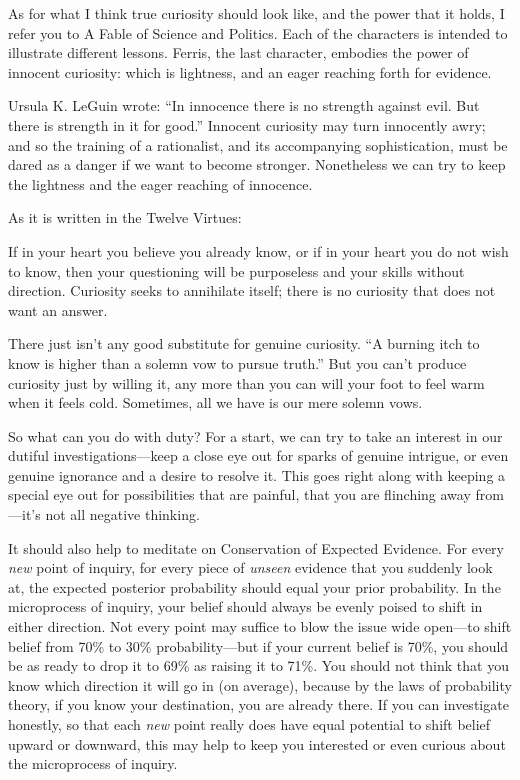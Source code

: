 {
 As for what I think true curiosity should look like, and the power
that it holds, I refer you to A Fable of Science and Politics. Each of
the characters is intended to illustrate different lessons. Ferris, the
last character, embodies the power of innocent curiosity: which is
lightness, and an eager reaching forth for evidence.}

{
 Ursula K. LeGuin wrote: ``In innocence there is
no strength against evil. But there is strength in it for
good.'' Innocent curiosity may
turn innocently awry; and so the training of a rationalist, and its
accompanying sophistication, must be dared as a danger if we want to
become stronger. Nonetheless we can try to keep the lightness and the
eager reaching of innocence.}

{
 As it is written in the Twelve Virtues:}

{
 If in your heart you believe you already know, or if in your heart
you do not wish to know, then your questioning will be purposeless and
your skills without direction. Curiosity seeks to annihilate itself;
there is no curiosity that does not want an answer.}

{
 There just isn't any good substitute for genuine
curiosity. ``A burning itch to know is higher than a
solemn vow to pursue truth.'' But you
can't produce curiosity just by willing it, any more
than you can will your foot to feel warm when it feels cold. Sometimes,
all we have is our mere solemn vows.}

{
 So what can you do with duty? For a start, we can try to take an
interest in our dutiful investigations---keep a close eye out for
sparks of genuine intrigue, or even genuine ignorance and a desire to
resolve it. This goes right along with keeping a special eye out for
possibilities that are painful, that you are flinching away
from---it's not all negative thinking.}

{
 It should also help to meditate on Conservation of Expected
Evidence. For every \textit{new} point of inquiry, for every piece of
\textit{unseen} evidence that you suddenly look at, the expected
posterior probability should equal your prior probability. In the
microprocess of inquiry, your belief should always be evenly poised to
shift in either direction. Not every point may suffice to blow the
issue wide open---to shift belief from 70\% to 30\% probability---but
if your current belief is 70\%, you should be as ready to drop it to
69\% as raising it to 71\%. You should not think that you know which
direction it will go in (on average), because by the laws of
probability theory, if you know your destination, you are already
there. If you can investigate honestly, so that each \textit{new} point
really does have equal potential to shift belief upward or downward,
this may help to keep you interested or even curious about the
microprocess of inquiry.}

